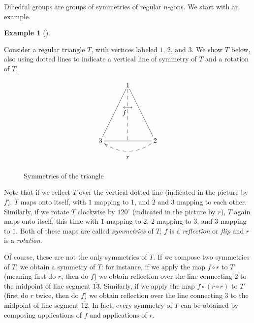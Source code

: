 \documentclass[10pt,]{book}
\theoremstyle{plain}
\theoremstyle{definition}
\theoremstyle{definition}
\theoremstyle{definition}
\newtheorem{example}[theorem]{Example}
\theoremstyle{definition}
\numberwithin{equation}{section}
\begin{document}
    Dihedral groups are groups of symmetries of regular \(n\)-gons. We start with an example.
\begin{example}[]\label{D3}

      Consider a regular triangle \(T\), with vertices labeled \(1\), \(2\), and \(3\). We show \(T\) below, also using dotted lines to indicate a vertical line of symmetry of \(T\) and a rotation of \(T\).%
\leavevmode%
\begin{figure}
\centering
{
 \[\xymatrix{&1\ar@{-}[ldd]\ar@{-}[rdd]\ar@{--}[dd]\\ &\stackrel{\longleftrightarrow}{\hspace{-10pt}f} &
\\ 3\ar@{-}[rr]&&2\ar@{-->}@/^{15pt}/[ll]^{\begin{array}{ccc}&r& \end{array}}}\]
}
\caption{Symmetries of the triangle\label{figure-2}}
\end{figure}
\par

      Note that if we reflect \(T\) over the vertical dotted line (indicated in the picture by \(f\)), \(T\) maps onto itself, with \(1\) mapping to \(1\), and \(2\) and \(3\) mapping to each other. Similarly, if we rotate \(T\) clockwise by \(120^{\circ}\) (indicated in the picture by \(r\)), \(T\) again maps onto itself, this time with \(1\) mapping to \(2\), \(2\) mapping to \(3\), and \(3\) mapping to \(1\). Both of these maps are called \emph{symmetries} of \(T\); \(f\) is a \emph{reflection} or \emph{flip} and \(r\) is a \emph{rotation}.
\par

      Of course, these are not the only symmetries of \(T\). If we compose
      two symmetries of \(T\), we obtain a symmetry of \(T\): for instance, if
      we apply the map \(f\circ r\) to \(T\) (meaning first do \(r\), then do
      \(f\)) we obtain reflection over the line connecting \(2\) to the
      midpoint of line segment \(\overline{13}\). Similarly, if we apply
      the map \(f\circ (r\circ r)\) to \(T\) (first do \(r\) twice, then do \(f\))
      we obtain reflection over the line connecting \(3\) to the midpoint of
      line segment \(\overline{12}\). In fact, every symmetry of \(T\) can be
      obtained by composing applications of \(f\) and applications of \(r\).
\par


\end{example}
\end{document}
